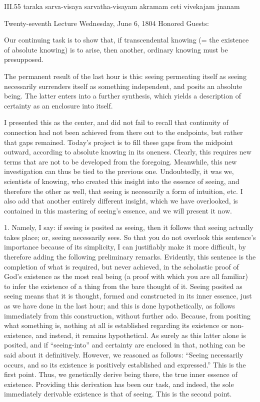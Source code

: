 III.55
taraka sarva-visaya sarvatha-visayam akramam ceti vivekajam jnanam

Twenty-seventh Lecture
Wednesday, June 6, 1804
Honored Guests:

Our continuing task is to show that,
if transcendental knowing
(= the existence of absolute knowing)
is to arise, then another,
ordinary knowing must be presupposed.

The permanent result of the last hour is this:
seeing permeating itself as seeing
necessarily surrenders itself
as something independent,
and posits an absolute being.
The latter enters into a further synthesis,
which yields a description of certainty
as an enclosure into itself.

I presented this as the center,
and did not fail to recall
that continuity of connection
had not been achieved
from there out to the endpoints,
but rather that gaps remained.
Today’s project is to fill these gaps
from the midpoint outward,
according to absolute knowing
in its oneness.
Clearly, this requires new terms
that are not to be developed from the foregoing.
Meanwhile, this new investigation can
thus be tied to the previous one.
Undoubtedly, it was we, scientists of knowing,
who created this insight into the essence of seeing,
and therefore the other as well,
that seeing is necessarily a form of intuition, etc.
I also add that another entirely different insight,
which we have overlooked, is contained in
this mastering of seeing’s essence,
and we will present it now.

1. Namely, I say:
if seeing is posited as seeing,
then it follows that seeing actually takes place;
or, seeing necessarily sees.
So that you do not overlook this sentence’s importance
because of its simplicity,
I can justifiably make it more difficult,
by therefore adding the following preliminary remarks.
Evidently, this sentence is the completion
of what is required, but never achieved,
in the scholastic proof of God’s existence
as the most real being
(a proof with which you are all familiar)
to infer the existence of a thing
from the bare thought of it.
Seeing posited as seeing means that
it is thought, formed and constructed
in its inner essence,
just as we have done in the last hour;
and this is done hypothetically,
as follows immediately from this construction,
without further ado.
Because, from positing what something is,
nothing at all is established regarding
its existence or non-existence,
and instead, it remains hypothetical.
As surely as this latter alone is posited,
and if “seeing-into” and certainty are enclosed in that,
nothing can be said about it definitively.
However, we reasoned as follows:
“Seeing necessarily occurs,
and so its existence is
positively established and expressed.”
This is the first point.
Thus, we genetically derive being there,
the true inner essence of existence.
Providing this derivation has been our task,
and indeed, the sole immediately derivable
existence is that of seeing.
This is the second point.

